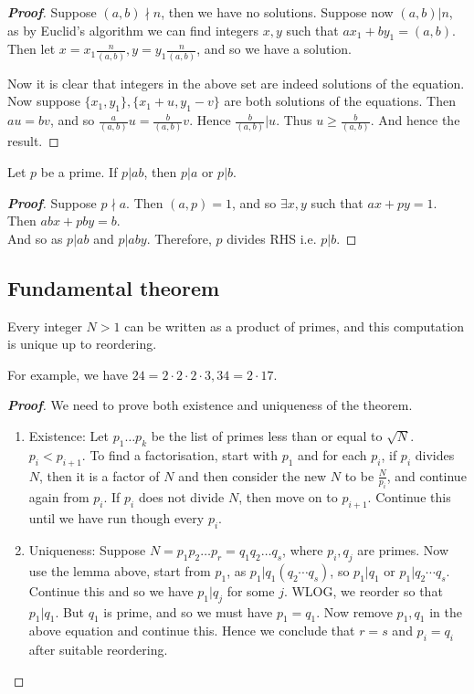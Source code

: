 \begin{proof}[\bf Proof] 
Suppose $(a,b) \nmid n$, then we have no solutions. Suppose now $(a,b)|n$, as by Euclid's algorithm we can find integers $x,y$ such that $ax_1+by_1=(a,b)$. Then let $x=x_1 \frac{n}{(a,b)},y=y_1 \frac{n}{(a,b)}$, and so we have a solution.

Now it is clear that integers in the above set are indeed solutions of the equation. Now suppose $\{x_1,y_1\}, \{x_1+u, y_1 -v\}$ are both solutions of the equations. Then $au=bv$, and so $\frac{a}{(a,b)}u=\frac{b}{(a,b)}v$. Hence $\frac{b}{(a,b)}|u$. Thus $u \ge \frac{b}{(a,b)}$. And hence the result.
\end{proof}

\begin{lemma} 
Let $p$ be a prime. If $p | a b$, then $p | a$ or $p | b$.
\end{lemma}

\begin{proof}[\bf Proof] 
Suppose $p \nmid a$. Then $(a, p)=1$, and so $\exists x, y$ such that $a  x + p  y =1$. Then $a b x + p b y =b$.\\
And so as $p | a b$ and $p |a b y$. Therefore, $p$ divides RHS i.e. $p | b$.
\end{proof}

\subsection{Fundamental theorem}

\begin{theorem}
Every integer $N > 1$ can be written as a product of primes, and this computation is unique up to reordering.
\end{theorem}

For example, we have $24 = 2 \cdot 2 \cdot 2 \cdot 3, 34 = 2 \cdot 17$.

\begin{proof}[\bf Proof]
We need to prove both existence and uniqueness of the theorem.
\begin{enumerate}
\item Existence: Let $p_1 \ldots p_k$ be the list of primes less than or equal to $\sqrt{N}$. $p_i < p_{i+1}$. To find a factorisation, start with $p_1$ and for each $p_i$, if $p_i$ divides $N$, then it is a factor of $N$ and then consider the new $N$ to be $\frac{N}{p_i}$, and continue again from $p_i$. If $p_i$ does not divide $N$, then move on to $p_{i+1}$. Continue this until we have run though every $p_i$.
\item Uniqueness: Suppose $N = p_1 p_2 \ldots p_r = q_1 q_2 \ldots q_s$, where $p_i, q_j$ are primes. Now use the lemma above, start from $p_1$, as $p_1 | q_1 (q_2 \cdots q_s)$, so $p_1 | q_1$ or $p_1 |q_2 \cdots q_s$.
Continue this and so we have $p_1 | q_j$ for some $j$. WLOG, we reorder so that $p_1 |q_1$. But $q_1$ is prime, and so we must have $p_1 = q_1$. Now remove $p_1, q_1$ in the above equation and continue this. Hence we conclude that $r = s$ and $p_i = q_i$ after suitable reordering.
\end{enumerate}
\end{proof}

